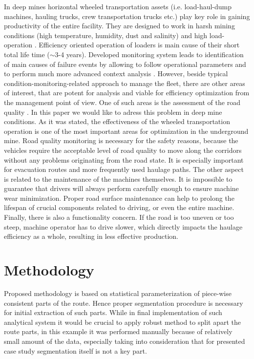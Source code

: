\documentclass[10pt]{article}
\begin{document}
In deep mines horizontal wheeled transportation assets (i.e. load-haul-dump machines, hauling trucks, crew transportation trucks etc.) play key role in gaining productivity of the entire facility. They are designed to work in harsh mining conditions (high temperature, humidity, dust and salinity) and high load-operation \cite{wodecki2018technical,wylomanska2014signal,gustafson2013influence}. Efficiency oriented operation of loaders is main cause of their short total life time (${\sim}$3-4 years). Developed monitoring system leads to identification of main causes of failure events by allowing to follow operational parameters and to perform much more advanced context analysis \cite{wodecki2018technical,zimroz2014self}. However, beside typical condition-monitoring-related approach to manage the fleet, there are other areas of interest, that are potent for analysis and viable for efficiency optimization from the management point of view. One of such areas is the assessment of the road quality  \cite{juska2009analysis, forslof2014continuous, astarita2012mobile, tai2010automatic, sandberg1990road, eriksson2008pothole, wang2018road}. In this paper we would like to adress this problem in deep mine conditions. As it was stated, the effectiveness of the wheeled transportation operation is one of the most important areas for optimization in the underground mine. Road quality monitoring is necessary for the safety reasons, because the vehicles require the acceptable level of road quality to move along the corridors without any problems originating from the road state. It is especially important for evacuation routes and more frequently used haulage paths. The other aspect is related to the maintenance of the machines themselves. It is impossible to guarantee that drivers will always perform carefully enough to ensure machine wear minimization. Proper road surface maintenance can help to prolong the lifespan of crucial components related to driving, or even the entire machine. Finally, there is also a functionality concern. If the road is too uneven or too steep, machine operator has to drive slower, which directly impacts the haulage efficiency as a whole, resulting in less effective production.

\section{Methodology}
Proposed methodology is based on statistical parameterization of piece-wise consistent parts of the route. Hence proper segmentation procedure is necessary for initial extraction of such parts. While in final implementation of such analytical system it would be crucial to apply robust method to split apart the route parts, in this example it was performed manually because of relatively small amount of the data, especially taking into consideration that for presented case study segmentation itself is not a key part.
\end{document}
